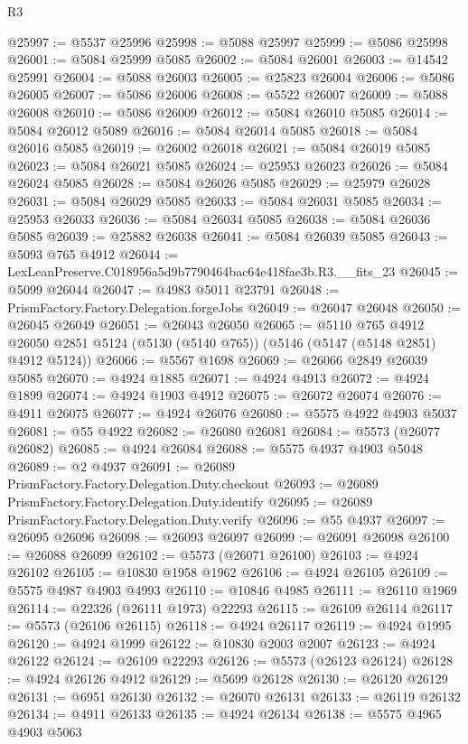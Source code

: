 \begin{lexlean}{R3}
\begin{coremodule}
@25997 := @5537 @25996
@25998 := @5088 @25997
@25999 := @5086 @25998
@26001 := @5084 @25999 @5085
@26002 := @5084 @26001
@26003 := @14542 @25991
@26004 := @5088 @26003
@26005 := @25823 @26004
@26006 := @5086 @26005
@26007 := @5086 @26006
@26008 := @5522 @26007
@26009 := @5088 @26008
@26010 := @5086 @26009
@26012 := @5084 @26010 @5085
@26014 := @5084 @26012 @5089
@26016 := @5084 @26014 @5085
@26018 := @5084 @26016 @5085
@26019 := @26002 @26018
@26021 := @5084 @26019 @5085
@26023 := @5084 @26021 @5085
@26024 := @25953 @26023
@26026 := @5084 @26024 @5085
@26028 := @5084 @26026 @5085
@26029 := @25979 @26028
@26031 := @5084 @26029 @5085
@26033 := @5084 @26031 @5085
@26034 := @25953 @26033
@26036 := @5084 @26034 @5085
@26038 := @5084 @26036 @5085
@26039 := @25882 @26038
@26041 := @5084 @26039 @5085
@26043 := @5093 @765 @4912
@26044 := LexLeanPreserve.C018956a5d9b7790464bac64e418fae3b.R3.__fits_23
@26045 := @5099 @26044
@26047 := @4983 @5011 @23791
@26048 := PrismFactory.Factory.Delegation.forgeJobs
@26049 := @26047 @26048
@26050 := @26045 @26049
@26051 := @26043 @26050
@26065 := @5110
    @765
    @4912
    @26050
    @2851
    @5124
    (@5130 (@5140 @765))
    (@5146 (@5147 (@5148 @2851) @4912 @5124))
@26066 := @5567 @1698
@26069 := @26066 @2849 @26039 @5085
@26070 := @4924 @1885
@26071 := @4924 @4913
@26072 := @4924 @1899
@26074 := @4924 @1903 @4912
@26075 := @26072 @26074
@26076 := @4911 @26075
@26077 := @4924 @26076
@26080 := @5575 @4922 @4903 @5037
@26081 := @55 @4922
@26082 := @26080 @26081
@26084 := @5573 (@26077 @26082)
@26085 := @4924 @26084
@26088 := @5575 @4937 @4903 @5048
@26089 := @2 @4937
@26091 := @26089 PrismFactory.Factory.Delegation.Duty.checkout
@26093 := @26089 PrismFactory.Factory.Delegation.Duty.identify
@26095 := @26089 PrismFactory.Factory.Delegation.Duty.verify
@26096 := @55 @4937
@26097 := @26095 @26096
@26098 := @26093 @26097
@26099 := @26091 @26098
@26100 := @26088 @26099
@26102 := @5573 (@26071 @26100)
@26103 := @4924 @26102
@26105 := @10830 @1958 @1962
@26106 := @4924 @26105
@26109 := @5575 @4987 @4903 @4993
@26110 := @10846 @4985
@26111 := @26110 @1969
@26114 := @22326 (@26111 @1973) @22293
@26115 := @26109 @26114
@26117 := @5573 (@26106 @26115)
@26118 := @4924 @26117
@26119 := @4924 @1995
@26120 := @4924 @1999
@26122 := @10830 @2003 @2007
@26123 := @4924 @26122
@26124 := @26109 @22293
@26126 := @5573 (@26123 @26124)
@26128 := @4924 @26126 @4912
@26129 := @5699 @26128
@26130 := @26120 @26129
@26131 := @6951 @26130
@26132 := @26070 @26131
@26133 := @26119 @26132
@26134 := @4911 @26133
@26135 := @4924 @26134
@26138 := @5575 @4965 @4903 @5063

\end{coremodule}
\end{lexlean}
